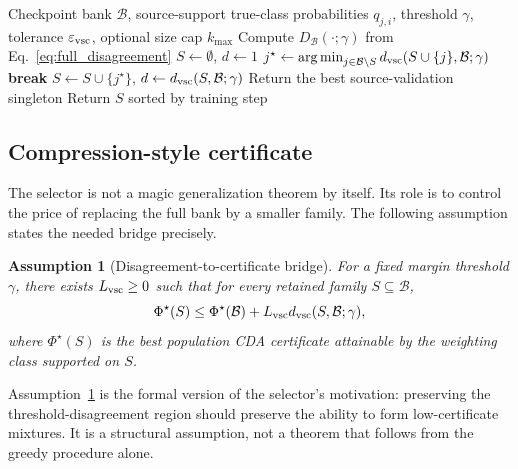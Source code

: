 \documentclass{article}
\newtheorem{assumption}[theorem]{Assumption}
\theoremstyle{definition}
\newcommand{\cB}{\mathcal{B}}
\newcommand{\argmin}{\operatorname*{arg\,min}}
\newcommand{\eps}{\varepsilon}
\begin{document}
\begin{algorithm}[t]
\caption{Version-space compression selector}
\label{alg:vsc}
\begin{algorithmic}[1]
\Require Checkpoint bank \(\cB\), source-support true-class probabilities \(q_{j,i}\), threshold \(\gamma\), tolerance \(\eps_{\rm vsc}\), optional size cap \(k_{\max}\)
\State Compute \(D_\cB(\cdot;\gamma)\) from Eq.~\eqref{eq:full_disagreement}
\State \(S\gets\emptyset\), \(d\gets 1\)
\While{\(d>\eps_{\rm vsc}\) and \((k_{\max}=0\) or \(|S|<k_{\max})\)}
    \State \(j^\star\gets \argmin_{j\in\cB\setminus S} d_{\rm vsc}(S\cup\{j\},\cB;\gamma)\)
    \If{\(d_{\rm vsc}(S\cup\{j^\star\},\cB;\gamma)\ge d\)}
        \State \textbf{break}
    \EndIf
    \State \(S\gets S\cup\{j^\star\}\), \(d\gets d_{\rm vsc}(S,\cB;\gamma)\)
\EndWhile
{}
    \State Return the best source-validation singleton
\EndIf
\State Return \(S\) sorted by training step
\end{algorithmic}
\end{algorithm}

\subsection{Compression-style certificate}

The selector is not a magic generalization theorem by itself. Its role is to control the price of replacing the full bank by a smaller family. The following assumption states the needed bridge precisely.

\begin{assumption}[Disagreement-to-certificate bridge]
\label{ass:vsc_bridge}
For a fixed margin threshold \(\gamma\), there exists \(L_{\rm vsc}\ge 0\) such that for every retained family \(S\subseteq\cB\),
\begin{equation}
\Phi^\star(S)
\le
\Phi^\star(\cB)+L_{\rm vsc}d_{\rm vsc}(S,\cB;\gamma),
\label{eq:vsc_bridge}
\end{equation}
where \(\Phi^\star(S)\) is the best population CDA certificate attainable by the weighting class supported on \(S\).
\end{assumption}

Assumption~\ref{ass:vsc_bridge} is the formal version of the selector's motivation: preserving the threshold-disagreement region should preserve the ability to form low-certificate mixtures. It is a structural assumption, not a theorem that follows from the greedy procedure alone.
\end{document}
